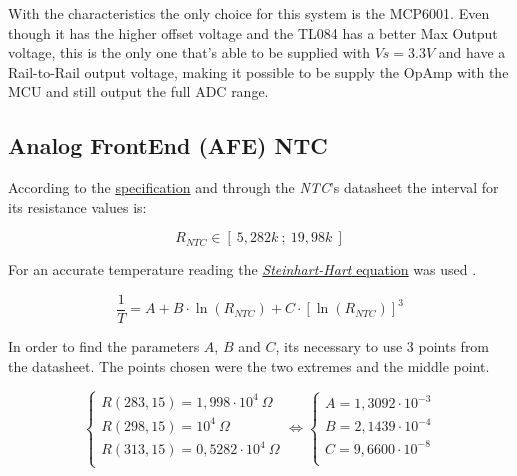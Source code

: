 \documentclass[12pt]{article}
\begin{document}
    With the characteristics the only choice for this system is the MCP6001. Even though it has the higher offset voltage and the TL084 has a better Max Output voltage, this is the only one that's able to be supplied with $Vs=3.3V$ and have a Rail-to-Rail output voltage, making it possible to be supply the OpAmp with the MCU and still output the full ADC range.


\subsection{Analog FrontEnd (AFE) NTC}
\label{AFENTC}

    According to the \hyperref[requirements]{specification} and through the \textit{NTC}'s datasheet the interval for its resistance values is:
    
    $$R_{NTC} \in [~5,282k~;~19,98k~]$$

    For an accurate temperature reading the 
    \hyperref[eq:1]{ \textit{Steinhart-Hart} equation} was used .

    \begin{equation} \label{eq:1}
    \frac{1}{T} = A + B\cdot \ln(R_{NTC}) + C\cdot [\ln(R_{NTC})]^3
    \end{equation}

    In order to find the parameters $A$, $B$ and $C$, its necessary to use 3 points from the datasheet. 
    The points chosen were the two extremes and the middle point.
    
    \begin{equation}
        \begin{cases}
        
            R( 283,15 ) = 1,998\cdot 10^4 ~\Omega \\
            R( 298,15 ) = 10^4 ~\Omega\\
            R( 313,15 ) = 0,5282 \cdot 10^4 ~\Omega\\
        
        \end{cases}
        \Leftrightarrow
        \begin{cases}
            A = 1,3092 \cdot 10^{-3}\\
            B = 2,1439 \cdot 10^{-4}\\
            C = 9,6600 \cdot 10^{-8}\\
        
        \end{cases}
    \end{equation}
\end{document}
